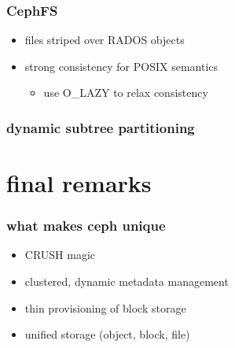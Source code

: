 \documentclass[10pt, compress]{beamer}
\begin{document}
\begin{frame}[fragile]
    \frametitle{CephFS}
    \begin{itemize}
        \item files striped over RADOS objects
        \item strong consistency for POSIX semantics
        \begin{itemize}
            \item use O\_LAZY to relax consistency
        \end{itemize}
    \end{itemize}
\end{frame}

\begin{frame}[fragile]
    \frametitle{dynamic subtree partitioning}
    \begin{center}
        
    \end{center}
\end{frame}

\section{final remarks}
\begin{frame}[fragile]
    \frametitle{what makes ceph unique}
    \begin{itemize}
        \item CRUSH magic
        \item clustered, dynamic metadata management
        \item thin provisioning of block storage
        \item unified storage (object, block, file)
    \end{itemize}
\end{frame}
\end{document}
